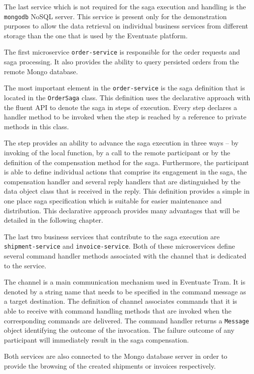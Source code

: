 \documentclass[oneside,
  digital, %
  table,   %
  nolof,     %
  nolot,     %
]{fithesis3}
\begin{document}
The last service which is not required for the saga execution and handling is the \texttt{mongodb} NoSQL server. This service is present only for the demonstration purposes to allow the data retrieval on individual business services from different storage than the one that is used by the Eventuate platform.

The first microservice \texttt{order-service} is responsible for the order requests and saga processing. It also provides the ability to query persisted orders from the remote Mongo database.

The most important element in the \texttt{order-service} is the saga definition that is located in the \texttt{OrderSaga} class. This definition uses the declarative approach with the fluent API to denote the saga in steps of execution. Every step declares a handler method to be invoked when the step is reached by a reference to private methods in this class.

The step provides an ability to advance the saga execution in three ways -- by invoking of the local function, by a call to the remote participant or by the definition of the compensation method for the saga. Furthermore, the participant is able to define individual actions that comprise its engagement in the saga, the compensation handler and several reply handlers that are distinguished by the data object class that is received in the reply. This definition provides a simple in one place saga specification which is suitable for easier maintenance and distribution. This declarative approach provides many advantages that will be detailed in the following chapter.

The last two business services that contribute to the saga execution are \texttt{shipment-service} and \texttt{invoice-service}. Both of these microservices define several command handler methods associated with the channel that is dedicated to the service. 

The channel is a main communication mechanism used in Eventuate Tram. It is denoted by a string name that needs to be specified in the command message as a target destination. The definition of channel associates commands that it is able to receive with command handling methods that are invoked when the corresponding commands are delivered. The command handler returns a \texttt{Message} object identifying the outcome of the invocation. The failure outcome of any participant will immediately result in the saga compensation.

Both services are also connected to the Mongo database server in order to provide the browsing of the created shipments or invoices respectively.
\end{document}
